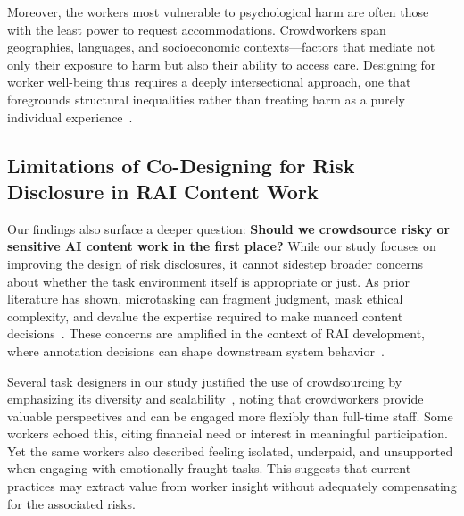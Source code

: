 Moreover, the workers most vulnerable to psychological harm are often those with the least power to request accommodations. Crowdworkers span geographies, languages, and socioeconomic contexts—factors that mediate not only their exposure to harm but also their ability to access care. Designing for worker well-being thus requires a deeply intersectional approach, one that foregrounds structural inequalities rather than treating harm as a purely individual experience~\cite{miceli2022data}.

\subsection{Limitations of Co-Designing for Risk Disclosure in RAI Content Work}

Our findings also surface a deeper question: \textbf{Should we crowdsource risky or sensitive AI content work in the first place?} While our study focuses on improving the design of risk disclosures, it cannot sidestep broader concerns about whether the task environment itself is appropriate or just. As prior literature has shown, microtasking can fragment judgment, mask ethical complexity, and devalue the expertise required to make nuanced content decisions~\cite{berg2018digital}. These concerns are amplified in the context of RAI development, where annotation decisions can shape downstream system behavior~\cite{wang2022whose, diaz2022crowdworksheets}.

Several task designers in our study justified the use of crowdsourcing by emphasizing its diversity and scalability~\cite{aroyo2023dices}, noting that crowdworkers provide valuable perspectives and can be engaged more flexibly than full-time staff. Some workers echoed this, citing financial need or interest in meaningful participation. Yet the same workers also described feeling isolated, underpaid, and unsupported when engaging with emotionally fraught tasks. This suggests that current practices may extract value from worker insight without adequately compensating for the associated risks. 

